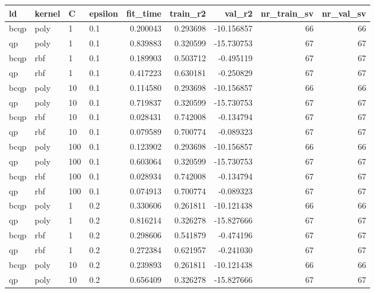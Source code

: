 \begin{tabular}{llllrrrrr}
\toprule
  ld & kernel &   C & epsilon &  fit\_time &  train\_r2 &     val\_r2 &  nr\_train\_sv &  nr\_val\_sv \\
\midrule
bcqp &   poly &   1 &     0.1 &  0.200043 &  0.293698 & -10.156857 &           66 &         66 \\
  qp &   poly &   1 &     0.1 &  0.839883 &  0.320599 & -15.730753 &           67 &         67 \\
bcqp &    rbf &   1 &     0.1 &  0.189903 &  0.503712 &  -0.495119 &           67 &         67 \\
  qp &    rbf &   1 &     0.1 &  0.417223 &  0.630181 &  -0.250829 &           67 &         67 \\
bcqp &   poly &  10 &     0.1 &  0.114580 &  0.293698 & -10.156857 &           66 &         66 \\
  qp &   poly &  10 &     0.1 &  0.719837 &  0.320599 & -15.730753 &           67 &         67 \\
bcqp &    rbf &  10 &     0.1 &  0.028431 &  0.742008 &  -0.134794 &           67 &         67 \\
  qp &    rbf &  10 &     0.1 &  0.079589 &  0.700774 &  -0.089323 &           67 &         67 \\
bcqp &   poly & 100 &     0.1 &  0.123902 &  0.293698 & -10.156857 &           66 &         66 \\
  qp &   poly & 100 &     0.1 &  0.603064 &  0.320599 & -15.730753 &           67 &         67 \\
bcqp &    rbf & 100 &     0.1 &  0.028934 &  0.742008 &  -0.134794 &           67 &         67 \\
  qp &    rbf & 100 &     0.1 &  0.074913 &  0.700774 &  -0.089323 &           67 &         67 \\
bcqp &   poly &   1 &     0.2 &  0.330606 &  0.261811 & -10.121438 &           66 &         66 \\
  qp &   poly &   1 &     0.2 &  0.816214 &  0.326278 & -15.827666 &           67 &         67 \\
bcqp &    rbf &   1 &     0.2 &  0.298606 &  0.541879 &  -0.474196 &           67 &         67 \\
  qp &    rbf &   1 &     0.2 &  0.272384 &  0.621957 &  -0.241030 &           67 &         67 \\
bcqp &   poly &  10 &     0.2 &  0.239893 &  0.261811 & -10.121438 &           66 &         66 \\
  qp &   poly &  10 &     0.2 &  0.656409 &  0.326278 & -15.827666 &           67 &         67 \\

\end{tabular}
